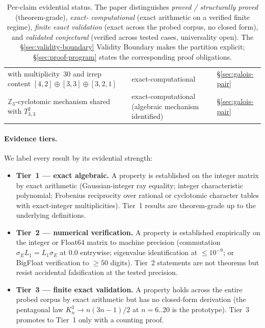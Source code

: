 \documentclass[12pt,a4paper]{article}
\theoremstyle{definition}
\theoremstyle{remark}
\newcommand{\bZ}{\mathbb{Z}}
\newcommand{\Kn}{K_n^3}
\begin{document}
\begin{table}[H]
\begin{tabular}{p{} p{} p{}}
  with multiplicity~$30$ and
  irrep content
  $[4,2] \oplus [3,3] \oplus [3,2,1]$
  & exact-computational
  & \S\ref{sec:galois-pair} \\
$\bZ_3$-cyclotomic mechanism shared with
  $T^2_{3,3}$
  & exact-computational
    (algebraic mechanism
    identified)
  & \S\ref{sec:galois-pair} \\
\bottomrule
\end{tabular}
\caption{Per-claim evidential status. The paper distinguishes
\emph{proved / structurally proved} (theorem-grade), \emph{exact-
computational} (exact arithmetic on a verified finite regime),
\emph{finite exact validation} (exact across the probed corpus, no
closed form), and \emph{validated conjectural} (verified across tested
cases, universality open). The \S\ref{sec:validity-boundary} Validity
Boundary makes the partition explicit; \S\ref{sec:proof-program}
states the corresponding proof obligations.}
\label{tab:claim-status-ledger}
\end{table}

\paragraph{Evidence tiers.}\label{sec:intro-tiers}

We label every result by its evidential strength:

\begin{itemize}\setlength{\itemsep}{1pt}
\item \textbf{Tier~1 --- exact algebraic.} A property is established on the
integer matrix by exact arithmetic (Gaussian-integer ray equality;
integer characteristic polynomial; Frobenius reciprocity over rational
or cyclotomic character tables with exact-integer multiplicities). Tier~1
results are theorem-grade up to the underlying definitions.
\item \textbf{Tier~2 --- numerical verification.} A property is established
empirically on the integer or Float64 matrix to machine precision
(commutation $\sigma_E L_1 = L_1 \sigma_E$ at $0.0$ entrywise; eigenvalue
identification at $\le 10^{-9}$; or BigFloat verification to $\ge 50$
digits). Tier~2 statements are not theorems but resist accidental
falsification at the tested precision.
\item \textbf{Tier~3 --- finite exact validation.} A property holds across
the entire probed corpus by exact arithmetic but has no closed-form
derivation (the pentagonal law $\Kn \to n(3n{-}1)/2$ at $n = 6{..}20$
is the prototype). Tier~3 promotes to Tier~1 only with a counting proof.
\end{itemize}
\end{document}
